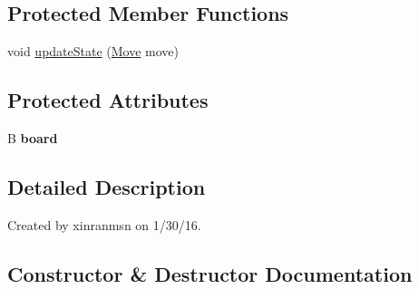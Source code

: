 \subsection*{Protected Member Functions}
\begin{DoxyCompactItemize}
\item 
void \hyperlink{classedu_1_1xwei12_1_1_chess_1_1_game_a9665877b5fde13664a68564fe8a81269}{update\+State} (\hyperlink{classedu_1_1xwei12_1_1_chess_1_1_game_1_1_move}{Move} move)
\end{DoxyCompactItemize}
\subsection*{Protected Attributes}
\begin{DoxyCompactItemize}
\item 
B {\bfseries board}\hypertarget{classedu_1_1xwei12_1_1_chess_1_1_game_a2bd69faf22d70d3d2a36ae4ad485341c}{}\label{classedu_1_1xwei12_1_1_chess_1_1_game_a2bd69faf22d70d3d2a36ae4ad485341c}

\end{DoxyCompactItemize}


\subsection{Detailed Description}
Created by xinranmsn on 1/30/16. 

\subsection{Constructor \& Destructor Documentation}
